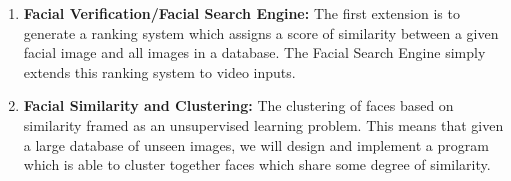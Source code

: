 \documentclass[11pt]{article} %
\theoremstyle{plain}
\theoremstyle{definition}
\theoremstyle{remark}
\numberwithin{equation}{section} %
\numberwithin{figure}{section} %
\numberwithin{table}{section} %
\begin{document}
\begin{enumerate}
    \item \textbf{Facial Verification/Facial Search Engine:} The first extension is to generate a ranking system which assigns a score of similarity between a given facial image and all images in a database. The Facial Search Engine simply extends this ranking system to video inputs.
  
  
  \item \textbf{Facial Similarity and Clustering:} The clustering of faces based on similarity framed as an unsupervised learning problem. This means that given a large database of unseen images, we will design and implement a program which is able to cluster together faces which share some degree of similarity.
\end{enumerate}


\end{document}
